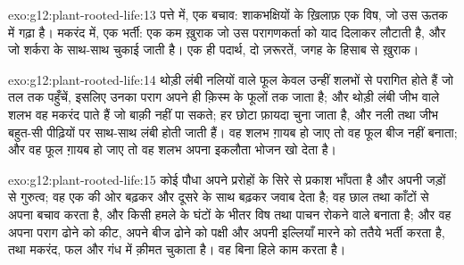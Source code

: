 \begin{solution}{exo:g12:plant-rooted-life:13}
पत्ते में, एक बचाव: शाकभक्षियों के ख़िलाफ़ एक विष, जो उस ऊतक में गढ़ा है।
मकरंद में, एक भर्ती: एक कम ख़ुराक जो उस परागणकर्ता को याद दिलाकर लौटाती है,
और जो शर्करा के साथ-साथ चुकाई जाती है। एक ही पदार्थ, दो ज़रूरतें, जगह के
हिसाब से ख़ुराक।
\end{solution}

\begin{solution}{exo:g12:plant-rooted-life:14}
थोड़ी लंबी नलियों वाले फूल केवल उन्हीं शलभों से परागित होते हैं जो तल तक
पहुँचें, इसलिए उनका पराग अपने ही क़िस्म के फूलों तक जाता है; और थोड़ी लंबी
जीभ वाले शलभ वह मकरंद पाते हैं जो बाक़ी नहीं पा सकते; हर छोटा फ़ायदा चुना
जाता है, और नली तथा जीभ बहुत-सी पीढ़ियों पर साथ-साथ लंबी होती जाती हैं। वह
शलभ ग़ायब हो जाए तो वह फूल बीज नहीं बनाता; और वह फूल ग़ायब हो जाए तो वह शलभ
अपना इकलौता भोजन खो देता है।
\end{solution}

\begin{solution}{exo:g12:plant-rooted-life:15}
कोई पौधा अपने प्ररोहों के सिरे से प्रकाश भाँपता है और अपनी जड़ों से
गुरुत्व; वह एक की ओर बढ़कर और दूसरे के साथ बढ़कर जवाब देता है; वह छाल तथा
काँटों से अपना बचाव करता है, और किसी हमले के घंटों के भीतर विष तथा पाचन
रोकने वाले बनाता है; और वह अपना पराग ढोने को कीट, अपने बीज ढोने को पक्षी और
अपनी इल्लियाँ मारने को ततैये भर्ती करता है, तथा मकरंद, फल और गंध में क़ीमत
चुकाता है। वह बिना हिले काम करता है।
\end{solution}

